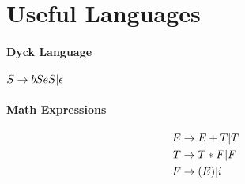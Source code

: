 \section{Useful Languages}

\paragraph{Dyck Language} $S \rightarrow bSeS | \epsilon$
\paragraph{Math Expressions}
\begin{align*}
    E &\rightarrow E + T | T \\
    T &\rightarrow T * F | F \\
    F &\rightarrow (E) | i
\end{align*}

